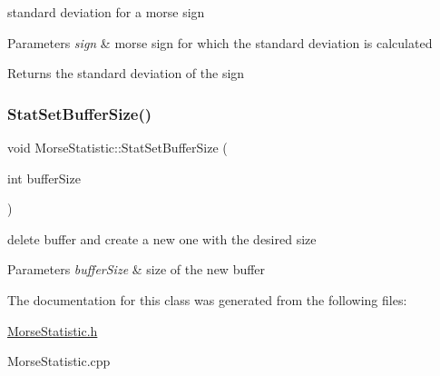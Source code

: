standard deviation for a morse sign 


\begin{DoxyParams}{Parameters}
{\em sign} & morse sign for which the standard deviation is calculated \\
\hline
\end{DoxyParams}
\begin{DoxyReturn}{Returns}
the standard deviation of the sign 
\end{DoxyReturn}
\mbox{\label{classMorseStatistic_ae5f4ab08849cd2cb724748108309661e}} 
\subsubsection{\texorpdfstring{Stat\+Set\+Buffer\+Size()}{StatSetBufferSize()}}
{\footnotesize\ttfamily void Morse\+Statistic\+::\+Stat\+Set\+Buffer\+Size (\begin{DoxyParamCaption}\item[{int}]{buffer\+Size }\end{DoxyParamCaption})}



delete buffer and create a new one with the desired size 


\begin{DoxyParams}{Parameters}
{\em buffer\+Size} & size of the new buffer \\
\hline
\end{DoxyParams}


The documentation for this class was generated from the following files\+:\begin{DoxyCompactItemize}
\item 
\hyperlink{MorseStatistic_8h}{Morse\+Statistic.\+h}\item 
Morse\+Statistic.\+cpp\end{DoxyCompactItemize}
